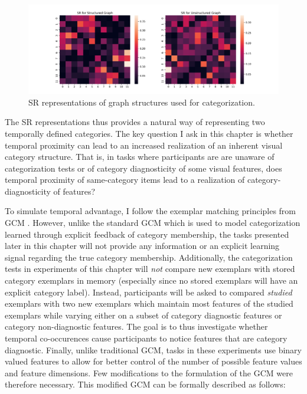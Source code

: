 \begin{figure}
    \centering
    \includegraphics[width = \textwidth]{chapter_notebooks/chapter_4/figures/category-sr-sims.png}
    \caption{SR representations of graph structures used for categorization.}
    \label{fig:category-sr-sims}
\end{figure}

The SR representations thus provides a natural way of representing two temporally defined categories. The key question I ask in this chapter is whether temporal proximity can lead to an increased realization of an inherent visual category structure. That is, in tasks where participants are are unaware of categorization tests or of category diagnosticity of some visual features, does temporal proximity of same-category items lead to a realization of category-diagnosticity of features?

To simulate temporal advantage, I follow the exemplar matching principles from GCM \cite{nosofsky1994comparing,rouder2004comparing,nosofsky2011generalized,nosofsky1986attention}. However, unlike the standard GCM which is used to model categorization learned through explicit feedback of category membership, the tasks presented later in this chapter will not provide any information or an explicit learning signal regarding the true category membership. Additionally, the categorization tests in experiments of this chapter will \textit{not} compare new exemplars with stored category exemplars in memory (especially since no stored exemplars will have an explicit category label). Instead, participants will be asked to compared \textit{studied} exemplars with two new exemplars which maintain most features of the studied exemplars while varying either on a subset of category diagnostic features or category non-diagnostic features. The goal is to thus investigate whether temporal co-occurences cause participants to notice features that are category diagnostic. Finally, unlike traditional GCM, tasks in these experiments use binary valued features to allow for better control of the number of possible feature values and feature dimensions. Few modifications to the formulation of the GCM were therefore necessary. This modified GCM can be formally described as follows:

